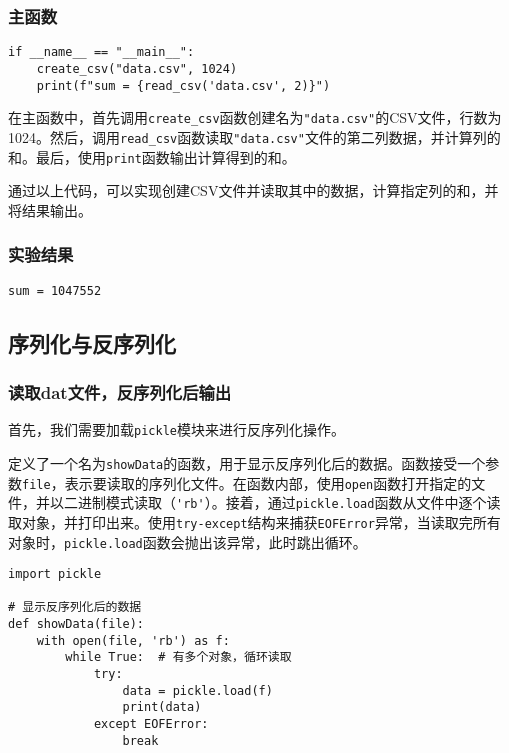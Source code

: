 \documentclass[lang=cn,11pt,a4paper]{elegantpaper}
\begin{document}
\subsubsection{主函数}
\begin{lstlisting}
if __name__ == "__main__":
    create_csv("data.csv", 1024)
    print(f"sum = {read_csv('data.csv', 2)}")
\end{lstlisting}
在主函数中，首先调用\lstinline{create_csv}函数创建名为\lstinline{"data.csv"}的CSV文件，行数为1024。然后，调用\lstinline{read_csv}函数读取\lstinline{"data.csv"}文件的第二列数据，并计算列的和。最后，使用\lstinline{print}函数输出计算得到的和。

通过以上代码，可以实现创建CSV文件并读取其中的数据，计算指定列的和，并将结果输出。

\subsubsection{实验结果}
\begin{lstlisting}[language=text]
sum = 1047552
\end{lstlisting}

\subsection{序列化与反序列化}

\subsubsection{读取dat文件，反序列化后输出}

首先，我们需要加载\lstinline{pickle}模块来进行反序列化操作。

定义了一个名为\lstinline{showData}的函数，用于显示反序列化后的数据。函数接受一个参数\lstinline{file}，表示要读取的序列化文件。在函数内部，使用\lstinline{open}函数打开指定的文件，并以二进制模式读取（\lstinline{'rb'}）。接着，通过\lstinline{pickle.load}函数从文件中逐个读取对象，并打印出来。使用\lstinline{try-except}结构来捕获\lstinline{EOFError}异常，当读取完所有对象时，\lstinline{pickle.load}函数会抛出该异常，此时跳出循环。

\begin{lstlisting}
import pickle

# 显示反序列化后的数据
def showData(file):
    with open(file, 'rb') as f:
        while True:  # 有多个对象，循环读取
            try:
                data = pickle.load(f)
                print(data)
            except EOFError:
                break
\end{lstlisting}
\end{document}
